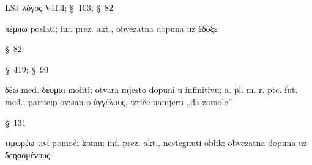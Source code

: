 \begin{description}[noitemsep]
\item[κοινῷ λόγῳ ] LSJ λόγος VII.4; §~103; §~82
\item[πέμπειν ] πέμπω poslati; inf. prez. akt., obvezatna dopuna uz ἔδοξε
\item[ἀγγέλους ] §~82
\item[ἐς Σπάρτην ] §~419; §~90
\item[δεησομένους ] δέω med. δέομαι moliti; otvara mjesto dopuni u infinitivu; a. pl. m. r. ptc. fut. med.; particip ovisan o ἀγγέλους, izriče namjeru „da zamole”
\item[Ἴωσι ] §~131
\item[τιμωρέειν] τιμωρέω τινί pomoći komu; inf. prez. akt., nestegnuti oblik; obvezatna dopuna uz δεησομένους

\end{description}

